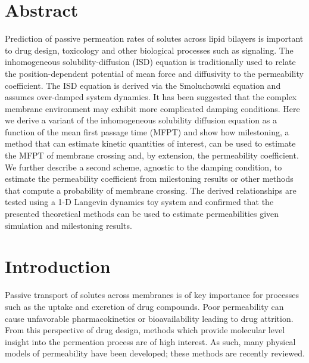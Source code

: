 \section{Abstract}
\par Prediction of passive permeation rates of solutes across lipid bilayers is important to drug design, toxicology and other biological processes such as signaling. The inhomogeneous solubility-diffusion (ISD) equation is traditionally used to relate the position-dependent potential of mean force and diffusivity to the permeability coefficient. The ISD equation is derived via the Smoluchowski equation and assumes over-damped system dynamics. It has been suggested that the complex membrane environment may exhibit more complicated damping conditions. Here we derive a variant of the inhomogeneous solubility diffusion equation as a function of the mean first passage time (MFPT) and show how milestoning, a method that can estimate kinetic quantities of interest, can be used to estimate the MFPT of membrane crossing and, by extension, the permeability coefficient. We further describe a second scheme, agnostic to the damping condition, to estimate the permeability coefficient from milestoning results or other methods that compute a probability of membrane crossing. The derived relationships are tested using a 1-D Langevin dynamics toy system and confirmed that the presented theoretical methods can be used to estimate permeabilities given simulation and milestoning results.

    \section{Introduction}
    \par Passive transport of solutes across membranes is of key importance for processes such as the uptake and excretion of drug compounds. Poor permeability can cause unfavorable pharmacokinetics or bioavailability leading to drug attrition\cite{Kola2004}. From this perspective of drug design, methods which provide molecular level insight into the permeation process are of high interest. As such, many physical models of permeability have been developed; these methods are recently reviewed\cite{Swift2013}.

